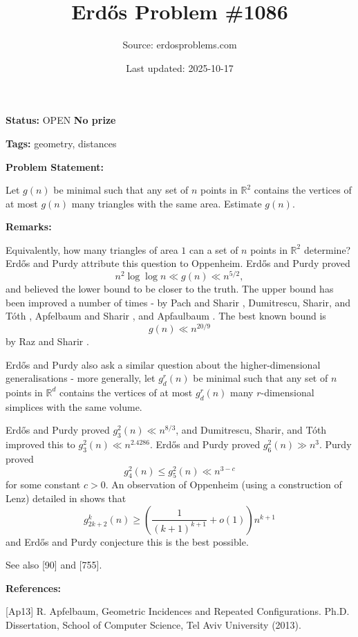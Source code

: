 \documentclass{article}
\title{Erd\H{o}s Problem \#1086}
\date{Last updated: 2025-10-17}
\author{Source: erdosproblems.com}
\begin{document}
\maketitle

\noindent\textbf{Status:} OPEN \quad \textbf{No prize}

\noindent\textbf{Tags:} geometry, distances

\medskip
\noindent\textbf{Problem Statement:}

Let $g(n)$ be minimal such that any set of $n$ points in $\mathbb{R}^2$ contains the vertices of at most $g(n)$ many triangles with the same area. Estimate $g(n)$.

\bigskip
\noindent\textbf{Remarks:}

Equivalently, how many triangles of area $1$ can a set of $n$ points in $\mathbb{R}^2$ determine? Erd\H{o}s and Purdy attribute this question to Oppenheim. Erd\H{o}s and Purdy \cite{ErPu71} proved\[n^2\log\log n \ll g(n) \ll n^{5/2},\]and believed the lower bound to be closer to the truth. The upper bound has been improved a number of times - by Pach and Sharir \cite{PaSh92}, Dumitrescu, Sharir, and T\'{o}th \cite{DST09}, Apfelbaum and Sharir \cite{ApSh10}, and Apfaulbaum \cite{Ap13}. The best known bound is\[g(n) \ll n^{20/9}\]by Raz and Sharir \cite{RaSh17}.

Erd\H{o}s and Purdy also ask a similar question about the higher-dimensional generalisations - more generally, let $g_d^{r}(n)$ be minimal such that any set of $n$ points in $\mathbb{R}^d$ contains the vertices of at most $g_d^{r}(n)$ many $r$-dimensional simplices with the same volume.

Erd\H{o}s and Purdy \cite{ErPu71} proved $g_3^2(n) \ll n^{8/3}$, and Dumitrescu, Sharir, and T\'{o}th \cite{DST09} improved this to $g_3^2(n) \ll n^{2.4286}$. 
Erd\H{o}s and Purdy \cite{ErPu71} proved $g_6^2(n)\gg n^3$. Purdy \cite{Pu74} proved\[g_4^2(n)\leq g^2_5(n) \ll n^{3-c}\]for some constant $c>0$. An observation of Oppenheim (using a construction of Lenz) detailed in \cite{ErPu71} shows that\[g_{2k+2}^k(n)\geq \left(\frac{1}{(k+1)^{k+1}}+o(1)\right)n^{k+1}\]and Erd\H{o}s and Purdy conjecture this is the best possible.

See also [90] and [755].

\bigskip
\noindent\textbf{References:}

[Ap13] R. Apfelbaum, Geometric Incidences and Repeated Configurations. Ph.D. Dissertation, School of Computer Science, Tel Aviv University (2013).
 
\end{document}
